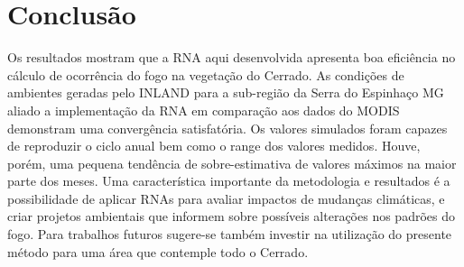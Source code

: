 \documentclass[conference]{IEEEtran}
\begin{document}
\section{Conclusão}
Os resultados mostram que a RNA aqui desenvolvida  apresenta boa eficiência no cálculo de ocorrência do fogo na vegetação do Cerrado. As condições de ambientes geradas pelo INLAND para a sub-região da Serra do Espinhaço MG aliado a implementação da RNA em comparação aos dados do MODIS demonstram uma convergência satisfatória. Os valores simulados foram capazes de reproduzir o ciclo anual bem como o range dos valores medidos. Houve, porém, uma pequena tendência de sobre-estimativa de valores máximos na maior parte dos meses. Uma característica importante da metodologia e resultados é a possibilidade de aplicar RNAs para avaliar impactos de mudanças climáticas, e criar projetos ambientais que informem sobre possíveis alterações nos padrões do fogo. Para trabalhos futuros sugere-se também investir na utilização do presente método para uma área que contemple todo o Cerrado.
\end{document}
